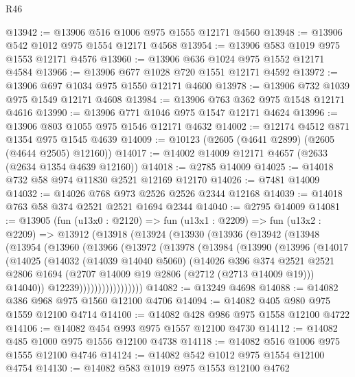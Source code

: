 \begin{lexlean}{R46}
\begin{coremodule}
@13942 := @13906 @516 @1006 @975 @1555 @12171 @4560
@13948 := @13906 @542 @1012 @975 @1554 @12171 @4568
@13954 := @13906 @583 @1019 @975 @1553 @12171 @4576
@13960 := @13906 @636 @1024 @975 @1552 @12171 @4584
@13966 := @13906 @677 @1028 @720 @1551 @12171 @4592
@13972 := @13906 @697 @1034 @975 @1550 @12171 @4600
@13978 := @13906 @732 @1039 @975 @1549 @12171 @4608
@13984 := @13906 @763 @362 @975 @1548 @12171 @4616
@13990 := @13906 @771 @1046 @975 @1547 @12171 @4624
@13996 := @13906 @803 @1055 @975 @1546 @12171 @4632
@14002 := @12174 @4512 @871 @1354 @975 @1545 @4639
@14009 := @10123 (@2605 (@4641 @2899) (@2605 (@4644 @2505) @12160))
@14017 := @14002 @14009 @12171 @4657 (@2633 (@2634 @1354 @4639 @12160))
@14018 := @2785 @14009
@14025 := @14018 @732 @58 @974 @11830 @2521 @12169 @12170
@14026 := @7481 @14009
@14032 := @14026 @768 @973 @2526 @2526 @2344 @12168
@14039 := @14018 @763 @58 @374 @2521 @2521 @1694 @2344
@14040 := @2795 @14009
@14081 := @13905
    (fun (u13x0 : @2120) =>
    fun (u13x1 : @2209) =>
    fun (u13x2 : @2209) =>
    @13912
      (@13918
        (@13924
          (@13930
            (@13936
              (@13942
                (@13948
                  (@13954
                    (@13960
                      (@13966
                        (@13972
                          (@13978
                            (@13984
                              (@13990
                                (@13996
                                  (@14017
                                    (@14025
                                      (@14032
                                        (@14039 @14040 @5060)
                                        (@14026
                                          @396
                                          @374
                                          @2521
                                          @2521
                                          @2806
                                          @1694
                                          (@2707 @14009 @19 @2806 (@2712 (@2713 @14009 @19)))
                                          @14040))
                                      @12239)))))))))))))))))
@14082 := @13249 @4698
@14088 := @14082 @386 @968 @975 @1560 @12100 @4706
@14094 := @14082 @405 @980 @975 @1559 @12100 @4714
@14100 := @14082 @428 @986 @975 @1558 @12100 @4722
@14106 := @14082 @454 @993 @975 @1557 @12100 @4730
@14112 := @14082 @485 @1000 @975 @1556 @12100 @4738
@14118 := @14082 @516 @1006 @975 @1555 @12100 @4746
@14124 := @14082 @542 @1012 @975 @1554 @12100 @4754
@14130 := @14082 @583 @1019 @975 @1553 @12100 @4762

\end{coremodule}
\end{lexlean}
